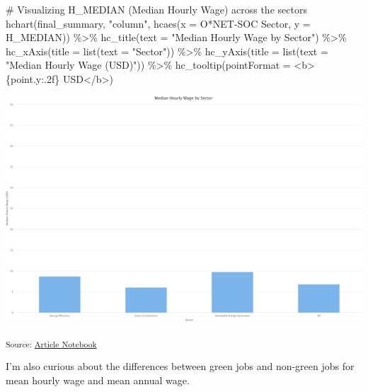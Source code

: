 \documentclass[
  letterpaper,
  DIV=11,
  numbers=noendperiod]{scrartcl}
\newenvironment{Shaded}{\begin{snugshade}}{\end{snugshade}}
\newcommand{\AttributeTok}[1]{\textcolor[rgb]{0.40,0.45,0.13}{#1}}
\newcommand{\CommentTok}[1]{\textcolor[rgb]{0.37,0.37,0.37}{#1}}
\newcommand{\FunctionTok}[1]{\textcolor[rgb]{0.28,0.35,0.67}{#1}}
\newcommand{\NormalTok}[1]{\textcolor[rgb]{0.00,0.23,0.31}{#1}}
\newcommand{\SpecialCharTok}[1]{\textcolor[rgb]{0.37,0.37,0.37}{#1}}
\newcommand{\StringTok}[1]{\textcolor[rgb]{0.13,0.47,0.30}{#1}}
\begin{document}
\begin{Shaded}
\begin{Highlighting}[]
\CommentTok{\# Visualizing H\_MEDIAN (Median Hourly Wage) across the sectors}
\FunctionTok{hchart}\NormalTok{(final\_summary, }\StringTok{"column"}\NormalTok{, }\FunctionTok{hcaes}\NormalTok{(}\AttributeTok{x =} \StringTok{\textasciigrave{}}\AttributeTok{O*NET{-}SOC Sector}\StringTok{\textasciigrave{}}\NormalTok{, }\AttributeTok{y =}\NormalTok{ H\_MEDIAN)) }\SpecialCharTok{\%\textgreater{}\%}
  \FunctionTok{hc\_title}\NormalTok{(}\AttributeTok{text =} \StringTok{"Median Hourly Wage by Sector"}\NormalTok{) }\SpecialCharTok{\%\textgreater{}\%}
  \FunctionTok{hc\_xAxis}\NormalTok{(}\AttributeTok{title =} \FunctionTok{list}\NormalTok{(}\AttributeTok{text =} \StringTok{"Sector"}\NormalTok{)) }\SpecialCharTok{\%\textgreater{}\%}
  \FunctionTok{hc\_yAxis}\NormalTok{(}\AttributeTok{title =} \FunctionTok{list}\NormalTok{(}\AttributeTok{text =} \StringTok{"Median Hourly Wage (USD)"}\NormalTok{)) }\SpecialCharTok{\%\textgreater{}\%}
  \FunctionTok{hc\_tooltip}\NormalTok{(}\AttributeTok{pointFormat =} \StringTok{\textquotesingle{}\textless{}b\textgreater{}\{point.y:.2f\} USD\textless{}/b\textgreater{}\textquotesingle{}}\NormalTok{)}
\end{Highlighting}
\end{Shaded}

\includegraphics{index_files/figure-pdf/unnamed-chunk-13-5.pdf}

\textsubscript{Source:
\href{https://beeckcenter.github.io/climate-equity-workforce/index-preview.html}{Article
Notebook}}

I'm also curious about the differences between green jobs and non-green
jobs for mean hourly wage and mean annual wage.
\end{document}
